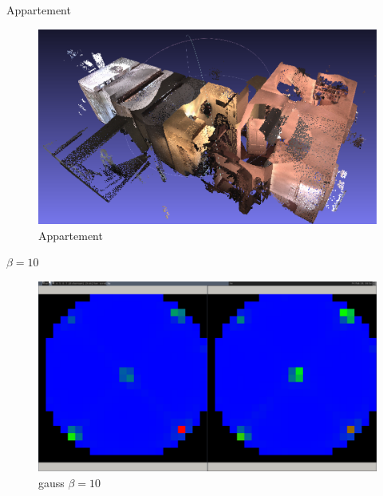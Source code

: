 \documentclass[11pt]{beamer}
\begin{document}
\begin{frame}{Appartement}
\begin{figure}[hbtp]
\centering
\includegraphics[width=\textwidth]{2014-02-28-101630_1015x585_scrot.png}
\caption{Appartement}
\end{figure}
\end{frame}

\begin{frame}{$\beta=10$}
\begin{figure}[hbtp]
\centering
\includegraphics[width=\textwidth]{2014-02-28-085518_1600x900_scrot.png}
\caption{gauss $\beta=10$}
\end{figure}
\end{frame}
\end{document}

